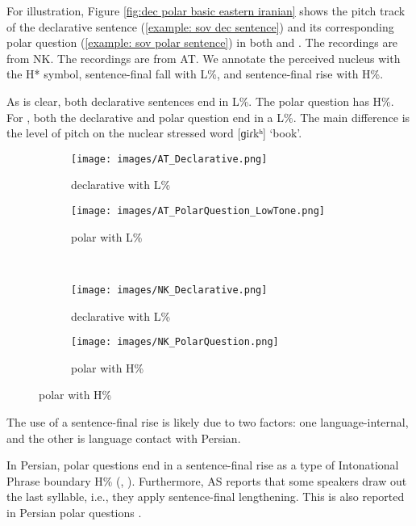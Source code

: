 		For illustration, Figure \ref{fig:dec polar basic eastern iranian}  shows the pitch track of the declarative sentence (\ref{example: sov dec sentence}) and its corresponding polar question (\ref{example: sov polar sentence}) in both {\seaSE} and {\iaIA}.  	The {\iaIA} recordings are from NK. The {\seaSEA} recordings are from AT. We annotate the perceived nucleus with the H* symbol, sentence-final fall with L\%, and sentence-final rise with H\%.
		
 
		
		
		As is clear, both declarative sentences end in L\%. The {\iaIA} polar question has H\%. For {\seaSE}, both the declarative and polar question   end in a L\%. The main difference is the level of pitch on the nuclear stressed word [{ɡiɾkʰ}] `book'.
		
	\vfill
	\begin{figure}[H]
		\caption{Pitch track of declarative (\ref{example: sov dec sentence}) and polar question (\ref{example: sov polar sentence})   in   {\seaAbbre}   an {\iaAbbre} \label{fig:dec polar basic eastern iranian}}
		\begin{subfigure}[b]{0.5\textwidth}
			\texttt{[image: images/AT\_Declarative.png]}
			\caption{{\seaAbbre} declarative   with L\%}
		\end{subfigure}%
		\begin{subfigure}[b]{0.5\textwidth}
			\texttt{[image: images/AT\_PolarQuestion\_LowTone.png]}
			\caption{{\seaAbbre} polar  with L\%}
		\end{subfigure}\smallskip\\
		\begin{subfigure}[b]{0.5\textwidth}
			\texttt{[image: images/NK\_Declarative.png]}
			\caption{{\iaAbbre} declarative   with L\%}
		\end{subfigure}%
		\begin{subfigure}[b]{0.5\textwidth}
			\texttt{[image: images/NK\_PolarQuestion.png]}
			\caption{{\iaAbbre} polar  with H\%}
		\end{subfigure}			
	\end{figure}\vfill\pagebreak
		
		The use of a sentence-final rise is likely due to two factors: one language-internal, and the other is language contact with Persian.
		
		
		In  Persian, polar questions end in a sentence-final rise as a type of Intonational Phrase boundary H\% (\citealt[111]{SadatTehrani-2007-IntonationPersian,sadat-2011-intonationPatternsInterrogativesPersian}, \citealt[55]{Mahjani-2003-PersianIntonation}). Furthermore, AS reports that some {\iaIA} speakers draw out the last syllable, i.e., they apply sentence-final lengthening. This is also reported in Persian polar questions \citep[113]{sadat-2011-intonationPatternsInterrogativesPersian}. 
		
